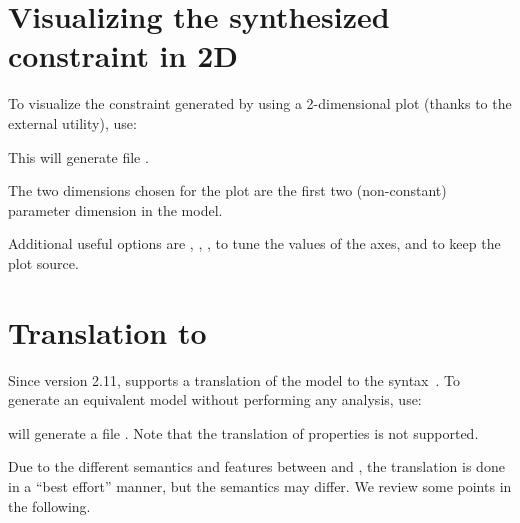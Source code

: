 \section{Visualizing the synthesized constraint in 2D}

To visualize the constraint generated by \imitator{} using a 2-dimensional plot (thanks to the external  utility), use:


This will generate file .

The two dimensions chosen for the plot are the first two (non-constant) parameter dimension in the model.

Additional useful options are
,
,
,
to tune the values of the axes,
and  to keep the plot source.


\section{Translation to \uppaal{}}\label{section:uppaal}

Since version 2.11, \imitator{} supports a translation of the model to the \uppaal{} syntax~\cite{LPY97}.
To generate an equivalent \uppaal{} model without performing any analysis, use:


\imitator{} will generate a file .
Note that the translation of properties is not supported.

Due to the different semantics and features between \imitator{} and \uppaal{}, the translation is done in a ``best effort'' manner, but the semantics may differ.
We review some points in the following.

